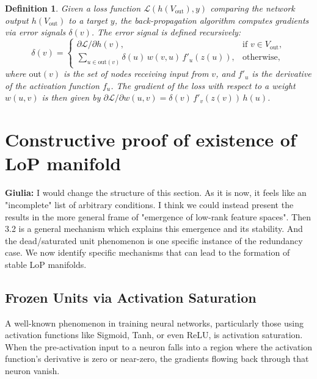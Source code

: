 \documentclass{article}
\newcommand{\Loss}{\mathcal{L}}
\newcommand{\giulia}[1]{{\color{ForestGreen}\textbf{Giulia:} #1}}
\newtheorem{definition}{Definition}[section]
\begin{document}
\begin{definition}
Given a loss function $\Loss(h(V_{\text{out}}),y)$ comparing the network output $h(V_{\text{out}})$ to a target $y$, the back-propagation algorithm computes gradients via error signals $\delta(v)$. The error signal is defined recursively:
\[
\delta(v)=
\begin{cases}
\partial\Loss/\partial h(v), & \text{if } v\in V_{\text{out}},\\[4pt]
\displaystyle\sum_{u\in\mathrm{out}(v)}\delta(u)\,w(v,u)\,f'_u(z(u)), &\text{otherwise},
\end{cases}
\]
where $\mathrm{out}(v)$ is the set of nodes receiving input from $v$, and $f'_u$ is the derivative of the activation function $f_u$. The gradient of the loss with respect to a weight $w(u,v)$ is then given by $\partial\Loss/\partial w(u,v)=\delta(v)\,f'_v(z(v))\,h(u)$.\qedhere
\end{definition}

\section{Constructive proof of existence of LoP manifold}
\label{sec:frozen}
\giulia{I would change the structure of this section. As it is now, it feels like an "incomplete" list of arbitrary conditions. I think we could instead present the results in the more general frame of "emergence of low-rank feature spaces". Then 3.2 is a general mechanism which explains this emergence and its stability. And the dead/saturated unit phenomenon is one specific instance of the redundancy case.}
We now identify specific mechanisms that can lead to the formation of stable LoP manifolds. 

\subsection{Frozen Units via Activation Saturation}

A well-known phenomenon in training neural networks, particularly those using activation functions like Sigmoid, Tanh, or even ReLU, is activation saturation. When the pre-activation input to a neuron falls into a region where the activation function's derivative is zero or near-zero, the gradients flowing back through that neuron vanish. 
\end{document}
